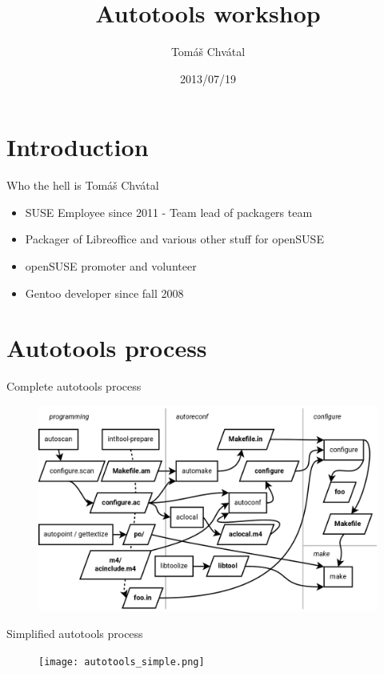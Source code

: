 \documentclass{beamer}
\author{Tom\'{a}\v{s} Chv\'{a}tal\newline {\small SUSE Packagers team}}
\title{Autotools workshop}
\date{2013/07/19}
\begin{document}
\begin{frame}[t,plain]
\titlepage
\end{frame}

\section{Introduction}

\begin{frame}[t]{Who the hell is Tomáš Chvátal}
	\begin{itemize}
	\item SUSE Employee since 2011 - Team lead of packagers team
	\item Packager of Libreoffice and various other stuff for openSUSE
	\item openSUSE promoter and volunteer
	\item Gentoo developer since fall 2008
	\end{itemize}
\end{frame}

\section{Autotools process}

\begin{frame}{Complete autotools process}
	\begin{figure}
	\includegraphics[width= 1.0\linewidth]{autotools.png}
	\end{figure}
\end{frame}

\begin{frame}{Simplified autotools process}
	\begin{figure}
	\texttt{[image: autotools\_simple.png]}
	\end{figure}
\end{frame}
\end{document}
